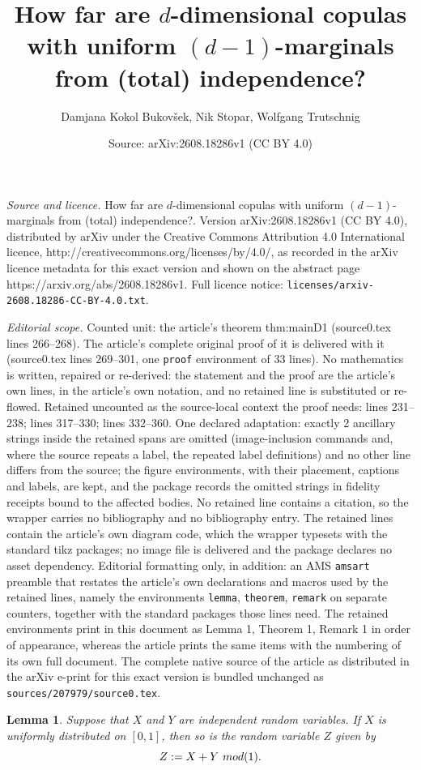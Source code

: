\documentclass[10pt,a4paper]{amsart}
\title{How far are $d$-dimensional copulas with uniform $(d-1)$-marginals from (total) independence?}
\author{Damjana Kokol Bukov\v{s}ek, Nik Stopar, Wolfgang Trutschnig}
\date{Source: arXiv:2608.18286v1 (CC BY 4.0)}
\newtheorem{lemma}{Lemma}
\begin{document}
\maketitle

\noindent\emph{Source and licence.} How far are $d$-dimensional copulas with uniform $(d-1)$-marginals from (total) independence?. Version arXiv:2608.18286v1 (CC BY 4.0), distributed by arXiv under the Creative Commons Attribution 4.0 International licence, http://creativecommons.org/licenses/by/4.0/, as recorded in the arXiv licence metadata for this exact version and shown on the abstract page https://arxiv.org/abs/2608.18286v1. Full licence notice: \texttt{licenses/arxiv-2608.18286-CC-BY-4.0.txt}.\par\smallskip

\noindent\textit{Editorial scope.} Counted unit: the article's theorem thm:mainD1 (source0.tex lines 266--268). The article's complete original proof of it is delivered with it (source0.tex lines 269--301, one \texttt{proof} environment of 33 lines). No mathematics is written, repaired or re-derived: the statement and the proof are the article's own lines, in the article's own notation, and no retained line is substituted or re-flowed.  Retained uncounted as the source-local context the proof needs: lines 231--238; lines 317--330; lines 332--360.  One declared adaptation: exactly 2 ancillary strings inside the retained spans are omitted (image-inclusion commands and, where the source repeats a label, the repeated label definitions) and no other line differs from the source; the figure environments, with their placement, captions and labels, are kept, and the package records the omitted strings in fidelity receipts bound to the affected bodies.  No retained line contains a citation, so the wrapper carries no bibliography and no bibliography entry.  The retained lines contain the article's own diagram code, which the wrapper typesets with the standard tikz packages; no image file is delivered and the package declares no asset dependency.  Editorial formatting only, in addition: an AMS \texttt{amsart} preamble that restates the article's own declarations and macros used by the retained lines, namely the environments \texttt{lemma}, \texttt{theorem}, \texttt{remark} on separate counters, together with the standard packages those lines need.  The retained environments print in this document as Lemma 1, Theorem 1, Remark 1 in order of appearance, whereas the article prints the same items with the numbering of its own full document.  The complete native source of the article as distributed in the arXiv e-print for this exact version is bundled unchanged as \texttt{sources/207979/source0.tex}.
\begin{lemma}\label{lem:haar}
    Suppose that $X$ and $Y$ are independent random variables. 
    If $X$ is uniformly distributed on $[0,1]$,  
    then so is the random variable $Z$ given by 
    $$
    Z:= X +Y \,\, \textup{mod (1)}.
    $$
\end{lemma}
\end{document}

